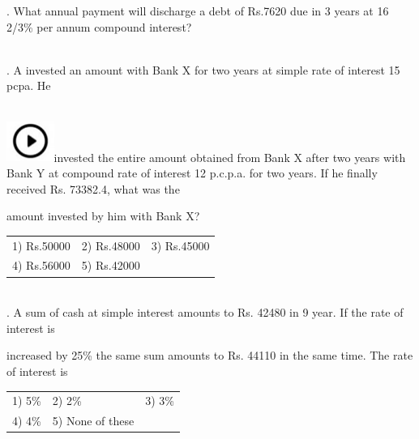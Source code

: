\documentclass{article}
\begin{document}
	. What annual payment will discharge a debt of Rs.7620 due in 3 years at 16 2/3\% per annum compound interest?
	
	\noindent 
	
	\noindent  \\  
	
	. A invested an amount with Bank X for two years at simple rate of interest 15 pcpa. He
	
	\noindent 
	
	\noindent \noindent \\ \includegraphics*[width=0.61in, height=0.52in]{images/image1}invested the entire amount obtained from Bank X after two years with Bank Y at compound rate of  interest 12 p.c.p.a. for two years. If he finally received Rs. 73382.4, what was the
	
	\noindent 
	
	\noindent amount invested by him with Bank X?
	
	\noindent 
	

		\begin{tabular}{p{1.7in} p{1.6in} p{1.6in}} \\ 
 1) Rs.50000  & 2) Rs.48000  & 3) Rs.45000
		\\
4) Rs.56000  & 5) Rs.42000   \\
\end{tabular}

	
	
	\noindent 
	
	\noindent  \\  
	
	. A sum of cash at simple interest amounts to Rs. 42480 in 9 year. If the rate of interest is
	
	\noindent 
	
	\noindent increased by 25\% the same sum amounts to Rs. 44110 in the same time. The rate of interest is
	
	\noindent 
	
	\noindent \begin{tabular}{p{1.7in} p{1.6in} p{1.6in}} \\ 
 1) 5\%                      & 2) 2\%                & 3) 3\%                \\
4) 4\%                & 5) None of these  \\
\end{tabular}
	
\end{document}
